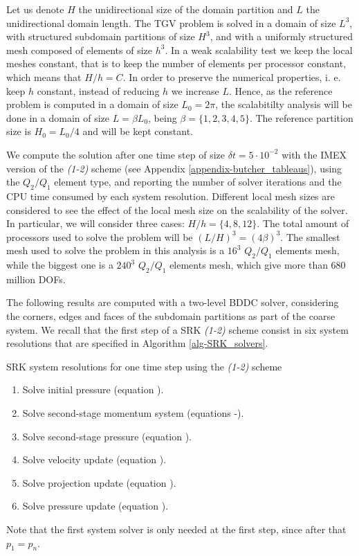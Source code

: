 Let us denote $ H $ the unidirectional size of the domain partition and $ L $ the unidirectional domain length. The TGV problem is solved in a domain of size $ L^3 $, with structured subdomain partitions of size $ H^3 $, and with a uniformly structured mesh composed of elements of size $ h^3 $. In a weak scalability test we keep the local meshes constant, that is to keep the number of elements per processor constant, which means that $ H/h= C $. In order to preserve the numerical properties, i. e. keep $ h $ constant, instead of reducing $ h $ we increase $ L $. Hence, as the reference problem is computed in a domain of size $ L_0=2\pi $, the scalabitilty analysis will be done in a domain of size $ L=\beta L_0 $, being $ \beta=\{1,2,3,4,5\} $. The reference partition size is $ H_0=L_0/4 $ and will be kept constant.

We compute the solution after one time step of size $\delta t=5\cdot10^{-2}$ with the IMEX version of the \textit{(1-2)} scheme (see Appendix \ref{appendix-butcher_tableaus}), using the $ Q_2/Q_1 $ element type, and reporting the number of solver iterations and the CPU time consumed by each system resolution. Different local mesh sizes are considered to see the effect of the local mesh size on the scalability of the solver. In particular, we will consider three cases: $ H/h=\{4,8,12\} $. The total amount of processors used to solve the problem will be $ (L/H)^3 = (4\beta)^3 $. The smallest mesh used to solve the problem in this analysis is a $ 16^3 $ $ Q_2/Q_1 $ elements mesh, while the biggest one is a $ 240^3 $ $ Q_2/Q_1 $ elements mesh, which give more than $ 680 $ million DOFs.

The following results are computed with a two-level BDDC solver, considering the corners, edges and faces of the subdomain partitions as part of the coarse system. We recall that the first step of a SRK \textit{(1-2)} scheme consist in six system resolutions that are specified in Algorithm \ref{alg-SRK_solvers}.
\begin{algorithm}
\caption{SRK system resolutions for one time step using the \textit{(1-2)} scheme}
\label{alg-SRK_solvers}
\begin{enumerate}
\item Solve initial pressure (equation ).
\item Solve second-stage momentum system (equations -).
\item Solve second-stage pressure (equation ).
\item Solve velocity update (equation ).
\item Solve projection update (equation ).
\item Solve pressure update (equation ).
\end{enumerate}
\end{algorithm}
Note that the first system solver is only needed at the first step, since after that $ p_1=p_n $.

